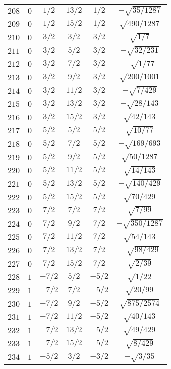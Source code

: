 \begin{table}
\begin{center}
\begin{tabular}{|c|c|c|c|c|c|}
$208$ & $0$ & $1/2$ & $13/2$ & $1/2$ & $-\sqrt{35/1287}$ \\ 
$209$ & $0$ & $1/2$ & $15/2$ & $1/2$ & $\sqrt{490/1287}$ \\ 
$210$ & $0$ & $3/2$ & $3/2$ & $3/2$ & $\sqrt{1/7}$ \\ 
$211$ & $0$ & $3/2$ & $5/2$ & $3/2$ & $-\sqrt{32/231}$ \\ 
$212$ & $0$ & $3/2$ & $7/2$ & $3/2$ & $-\sqrt{1/77}$ \\ 
$213$ & $0$ & $3/2$ & $9/2$ & $3/2$ & $\sqrt{200/1001}$ \\ 
$214$ & $0$ & $3/2$ & $11/2$ & $3/2$ & $-\sqrt{7/429}$ \\ 
$215$ & $0$ & $3/2$ & $13/2$ & $3/2$ & $-\sqrt{28/143}$ \\ 
$216$ & $0$ & $3/2$ & $15/2$ & $3/2$ & $\sqrt{42/143}$ \\ 
$217$ & $0$ & $5/2$ & $5/2$ & $5/2$ & $\sqrt{10/77}$ \\ 
$218$ & $0$ & $5/2$ & $7/2$ & $5/2$ & $-\sqrt{169/693}$ \\ 
$219$ & $0$ & $5/2$ & $9/2$ & $5/2$ & $\sqrt{50/1287}$ \\ 
$220$ & $0$ & $5/2$ & $11/2$ & $5/2$ & $\sqrt{14/143}$ \\ 
$221$ & $0$ & $5/2$ & $13/2$ & $5/2$ & $-\sqrt{140/429}$ \\ 
$222$ & $0$ & $5/2$ & $15/2$ & $5/2$ & $\sqrt{70/429}$ \\ 
$223$ & $0$ & $7/2$ & $7/2$ & $7/2$ & $\sqrt{7/99}$ \\ 
$224$ & $0$ & $7/2$ & $9/2$ & $7/2$ & $-\sqrt{350/1287}$ \\ 
$225$ & $0$ & $7/2$ & $11/2$ & $7/2$ & $\sqrt{54/143}$ \\ 
$226$ & $0$ & $7/2$ & $13/2$ & $7/2$ & $-\sqrt{98/429}$ \\ 
$227$ & $0$ & $7/2$ & $15/2$ & $7/2$ & $\sqrt{2/39}$ \\ 
$228$ & $1$ & $-7/2$ & $5/2$ & $-5/2$ & $\sqrt{1/22}$ \\ 
$229$ & $1$ & $-7/2$ & $7/2$ & $-5/2$ & $\sqrt{20/99}$ \\ 
$230$ & $1$ & $-7/2$ & $9/2$ & $-5/2$ & $\sqrt{875/2574}$ \\ 
$231$ & $1$ & $-7/2$ & $11/2$ & $-5/2$ & $\sqrt{40/143}$ \\ 
$232$ & $1$ & $-7/2$ & $13/2$ & $-5/2$ & $\sqrt{49/429}$ \\ 
$233$ & $1$ & $-7/2$ & $15/2$ & $-5/2$ & $\sqrt{8/429}$ \\ 
$234$ & $1$ & $-5/2$ & $3/2$ & $-3/2$ & $-\sqrt{3/35}$ \\ 

\end{tabular}
\end{center}
\end{table}
